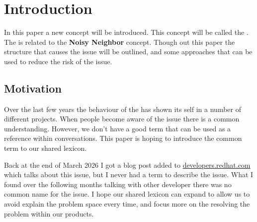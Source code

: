 \section{Introduction}
\label{sec:introduction}
In this paper a new concept will be introduced.
This concept will be called the \nn{}.
The \nn{} is related to the \textbf{Noisy Neighbor} concept.\cite{claytonsiemens77_noisy_nodate}
Though out this paper the structure that causes the \nn{} issue will be outlined, and some approaches that can be used to reduce the risk of the issue.

\subsection{Motivation}
\label{sec:motivation}
Over the last few years the behaviour of the \nn{} has shown its self in a number of different projects.
When people become aware of the issue there is a common understanding.
However, we don't have a good term that can be used as a reference within conversations.
This paper is hoping to introduce \nn{} the common term to our shared lexicon.

Back at the end of March 2026 I got a blog post\cite{fitzpatrick_unlocking_2026} added to \href{https://developers.redhat.com}{developers.redhat.com} which talks about this issue, but I never had a term to describe the issue.
What I found over the following months talking with other developer there was no common name for the issue.
I hope our shared lexicon can expand to allow us to avoid explain the problem space every time, and focus more on the resolving the \nn{} problem within our products.


